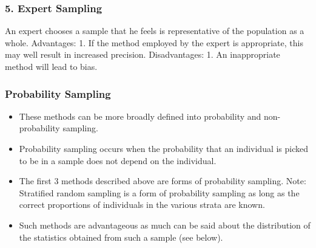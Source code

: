 \subsubsection{5. Expert Sampling}
An expert chooses a sample that he feels is representative of the
population as a whole.
Advantages: 1. If the method employed by the expert is
appropriate, this may well result in increased precision.
Disadvantages: 1. An inappropriate method will lead to bias.

\subsubsection{Probability Sampling}
\begin{itemize}
\item These methods can be more broadly defined into probability and
non-probability sampling.
\item Probability sampling occurs when the probability that an individual
is picked to be in a sample does not depend on the individual.
\item 
The first 3 methods described above are forms of probability
sampling. Note: Stratified random sampling is a form of
probability sampling as long as the correct proportions of
individuals in the various strata are known.
\item Such methods are advantageous as much can be said about the
distribution of the statistics obtained from such a sample (see
below).
\end{itemize}
